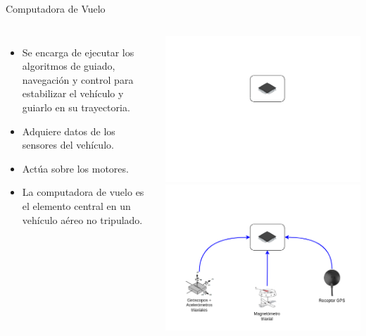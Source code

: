 \begin{frame}{Computadora de Vuelo}
	\begin{columns}
			\begin{itemize}
				\item <2->Se encarga de ejecutar los algoritmos de guiado, navegación y control para estabilizar el vehículo y guiarlo en su trayectoria.
				\item <3->Adquiere datos de los sensores del vehículo.
				\item <4->Actúa sobre los motores.
				\item <5->La computadora de vuelo es el elemento central en un vehículo aéreo no tripulado.
			\end{itemize}
			\begin{overprint}
				\includegraphics[width=\textwidth]{img/drone_actuadores_sensores_1.png}
				\onslide<3>\includegraphics[width=\textwidth]{img/drone_actuadores_sensores_2.png}

\end{overprint}
\end{columns}
\end{frame}
